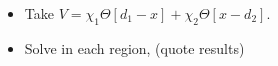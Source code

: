 \begin{itemize}
  \item {Take $V=\chi_1\Theta[d_1-x]+\chi_2\Theta[x-d_2]$.}

  \item {Solve in each region, (quote results)}

\end{itemize}
